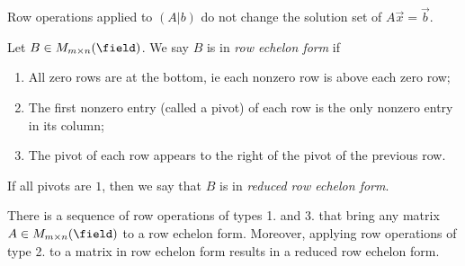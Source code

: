 \begin{corollary}
    Row operations applied to $(A \vert b)$ do not change the solution set of $A \vec{x} = \vec{b}$.
\end{corollary}

\begin{definition}
    Let $B \in M_{m \times n}(\field)$. We say $B$ is in \emph{row echelon form} if \begin{enumerate}
            \item All zero rows are at the bottom, ie each nonzero row is above each zero row;
            \item The first nonzero entry (called a pivot) of each row is the only nonzero entry in its column;
            \item The pivot of each row appears to the right of the pivot of the previous row.
        \end{enumerate}
        If all pivots are $1$, then we say that $B$ is in \emph{reduced row echelon form}.
\end{definition}

\begin{theorem}
    There is a sequence of row operations of types 1. and 3. that bring any matrix $A \in M_{m \times n}(\field)$ to a row echelon form. Moreover, applying row operations of type 2. to a matrix in row echelon form results in a reduced row echelon form.
\end{theorem}